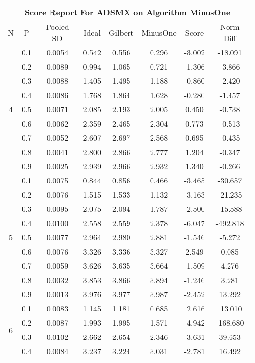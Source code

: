 \documentclass[11pt,a4paper]{report}
\begin{document}
\begin{longtable}{ | c | c || c | c | c | c | c | c | }
\hline
\multicolumn{8}{|c|}{ Score Report For ADSMX on Algorithm MinusOne} \\
\hline
N & P & Pooled SD &  Ideal &  Gilbert & MinusOne  & Score & Norm Diff \\
 \hline
 \hline
 \endhead
\multirow{9}{*}{4} & 0.1 & 0.0054 & 0.542 & 0.556 & 0.296 & -3.002 & -18.091 \\
 & 0.2 & 0.0089 & 0.994 & 1.065 & 0.721 & -1.306 & -3.866 \\
 & 0.3 & 0.0088 & 1.405 & 1.495 & 1.188 & -0.860 & -2.420 \\
 & 0.4 & 0.0086 & 1.768 & 1.864 & 1.628 & -0.280 & -1.457 \\
 & 0.5 & 0.0071 & 2.085 & 2.193 & 2.005 & 0.450 & -0.738 \\
 & 0.6 & 0.0062 & 2.359 & 2.465 & 2.304 & 0.773 & -0.513 \\
 & 0.7 & 0.0052 & 2.607 & 2.697 & 2.568 & 0.695 & -0.435 \\
 & 0.8 & 0.0041 & 2.800 & 2.866 & 2.777 & 1.204 & -0.347 \\
 & 0.9 & 0.0025 & 2.939 & 2.966 & 2.932 & 1.340 & -0.266 \\
 \hline
\multirow{9}{*}{5} & 0.1 & 0.0075 & 0.844 & 0.856 & 0.466 & -3.465 & -30.657 \\
 & 0.2 & 0.0076 & 1.515 & 1.533 & 1.132 & -3.163 & -21.235 \\
 & 0.3 & 0.0095 & 2.075 & 2.094 & 1.787 & -2.500 & -15.588 \\
 & 0.4 & 0.0100 & 2.558 & 2.559 & 2.378 & -6.047 & -492.818 \\
 & 0.5 & 0.0077 & 2.964 & 2.980 & 2.881 & -1.546 & -5.272 \\
 & 0.6 & 0.0076 & 3.326 & 3.336 & 3.327 & 2.549 & 0.085 \\
 & 0.7 & 0.0059 & 3.626 & 3.635 & 3.664 & -1.509 & 4.276 \\
 & 0.8 & 0.0032 & 3.853 & 3.866 & 3.894 & -1.246 & 3.281 \\
 & 0.9 & 0.0013 & 3.976 & 3.977 & 3.987 & -2.452 & 13.292 \\
 \hline
\multirow{9}{*}{6} & 0.1 & 0.0083 & 1.145 & 1.181 & 0.685 & -2.616 & -13.010 \\
 & 0.2 & 0.0087 & 1.993 & 1.995 & 1.571 & -4.942 & -168.680 \\
 & 0.3 & 0.0102 & 2.662 & 2.654 & 2.346 & -3.631 & 39.653 \\
 & 0.4 & 0.0084 & 3.237 & 3.224 & 3.031 & -2.781 & 16.492 \\

\end{longtable}
\end{document}
